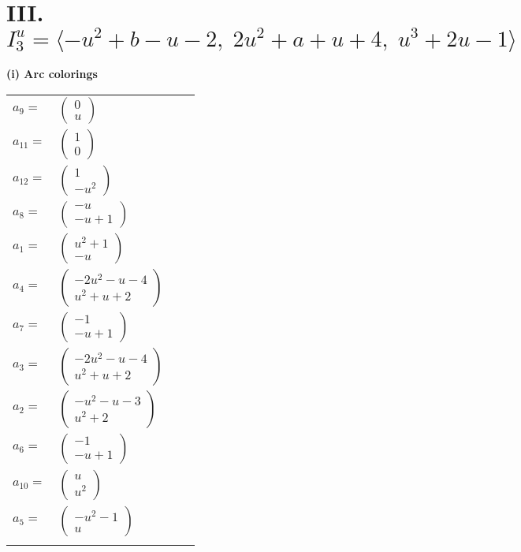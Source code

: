 \documentclass[1p]{elsarticle_modified}
\theoremstyle{definition}
\begin{document}
\centering \section*{III. $I^u_{3}= \langle - u^2+b- u-2,\;2 u^2+a+u+4,\;u^3+2 u-1 \rangle$}
\flushleft \textbf{(i) Arc colorings}\\
\begin{tabular}{m{7pt} m{180pt} m{7pt} m{180pt} }
\flushright $a_{9}=$&$\begin{pmatrix}0\\u\end{pmatrix}$ \\
\flushright $a_{11}=$&$\begin{pmatrix}1\\0\end{pmatrix}$ \\
\flushright $a_{12}=$&$\begin{pmatrix}1\\- u^2\end{pmatrix}$ \\
\flushright $a_{8}=$&$\begin{pmatrix}- u\\- u+1\end{pmatrix}$ \\
\flushright $a_{1}=$&$\begin{pmatrix}u^2+1\\- u\end{pmatrix}$ \\
\flushright $a_{4}=$&$\begin{pmatrix}-2 u^2- u-4\\u^2+u+2\end{pmatrix}$ \\
\flushright $a_{7}=$&$\begin{pmatrix}-1\\- u+1\end{pmatrix}$ \\
\flushright $a_{3}=$&$\begin{pmatrix}-2 u^2- u-4\\u^2+u+2\end{pmatrix}$ \\
\flushright $a_{2}=$&$\begin{pmatrix}- u^2- u-3\\u^2+2\end{pmatrix}$ \\
\flushright $a_{6}=$&$\begin{pmatrix}-1\\- u+1\end{pmatrix}$ \\
\flushright $a_{10}=$&$\begin{pmatrix}u\\u^2\end{pmatrix}$ \\
\flushright $a_{5}=$&$\begin{pmatrix}- u^2-1\\u\end{pmatrix}$\\&\end{tabular}
\end{document}

